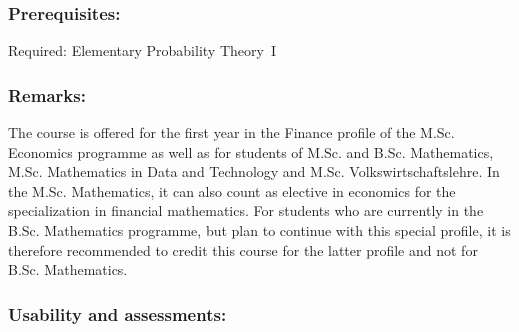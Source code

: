 \documentclass[a4paper,10pt]{article}
\begin{document}
\subsubsection*{\large
    Prerequisites:
}
Required: Elementary Probability Theory~I
\subsubsection*{\large
    Remarks:
}
The course  is offered for the first year in the Finance profile of the M.Sc. Economics programme as well as for students of M.Sc. and B.Sc. Mathematics, M.Sc. Mathematics in Data and Technology and M.Sc. Volkswirtschaftslehre. In the M.Sc. Mathematics, it can also count as elective in economics for the specialization in financial mathematics. For students who are currently in the B.Sc. Mathematics programme, but plan to continue with this special profile, it is therefore recommended to credit this course for the latter profile and not for B.Sc. Mathematics.
\cleardoublepage
\subsubsection*{\large
    Usability and assessments:
}
\end{document}
